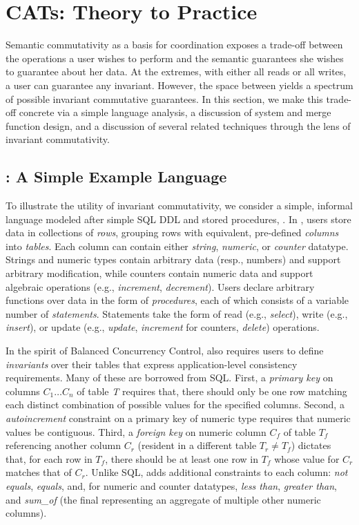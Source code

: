 
\section{CATs: Theory to Practice}
\label{sec:bcc-practice}

Semantic commutativity as a basis for coordination exposes a trade-off
between the operations a user wishes to perform and the semantic
guarantees she wishes to guarantee about her data. At the extremes,
with either all reads or all writes, a user can guarantee any
invariant. However, the space between yields a spectrum of possible
invariant commutative guarantees. In this section, we make this
trade-off concrete via a simple language analysis, a discussion of
system and merge function design, and a discussion of several related
techniques through the lens of invariant commutativity.

\subsection{\lang: A Simple Example Language}

To illustrate the utility of invariant commutativity, we consider a
simple, informal language modeled after simple SQL DDL and stored
procedures, \lang. In \lang, users store data in collections of
\textit{rows}, grouping rows with equivalent, pre-defined
\textit{columns} into \textit{tables}. Each column can contain either
\textit{string}, \textit{numeric}, or \textit{counter}
datatype. Strings and numeric types contain arbitrary data (resp.,
numbers) and support arbitrary modification, while counters contain
numeric data and support algebraic operations (e.g.,
\textit{increment}, \textit{decrement}). Users declare arbitrary
functions over data in the form of \textit{procedures}, each of which
consists of a variable number of \textit{statements}. Statements take
the form of read (e.g., \textit{select}), write (e.g.,
\textit{insert}), or update (e.g., \textit{update}, \textit{increment}
for counters, \textit{delete}) operations.

In the spirit of Balanced Concurrency Control, \lang also requires
users to define \textit{invariants} over their tables that express
application-level consistency requirements. Many of these are borrowed
from SQL. First, a \textit{primary key} on columns $C_1 \dots C_n$ of
table \textit{T} requires that, there should only be one row matching
each distinct combination of possible values for the specified
columns. Second, a \textit{autoincrement} constraint on a primary key
of numeric type requires that numeric values be contiguous. Third, a
\textit{foreign key} on numeric column $C_f$ of table $T_f$
referencing another column $C_r$ (resident in a different table $T_r
\neq T_f$) dictates that, for each row in $T_f$, there should be at
least one row in $T_f$ whose value for $C_r$ matches that of
$C_r$. Unlike SQL, \lang adds additional constraints to each column:
\textit{not equals}, \textit{equals}, and, for numeric and counter
datatypes, \textit{less than}, \textit{greater than}, and
\textit{sum\_of} (the final representing an aggregate of multiple
other numeric columns).



